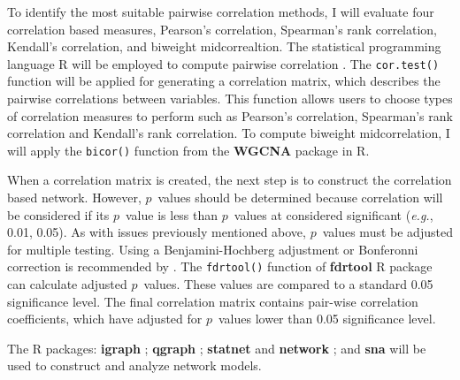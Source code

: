 To identify the most suitable pairwise correlation methods, I will evaluate four correlation based measures, Pearson's correlation, Spearman's rank correlation, Kendall's correlation, and biweight midcorrealtion. The statistical programming language \textsf{R} will be employed to compute pairwise correlation \citep{R:2014a}. The \texttt{cor.test()} function will be applied for generating a correlation matrix, which describes the pairwise correlations between variables. This function allows users to choose types of correlation measures to perform such as Pearson's correlation, Spearman's rank correlation and Kendall's rank correlation. To compute biweight midcorrelation, I will apply the \texttt{bicor()} function from the \textbf{WGCNA} package \citep{Langfelder:2008bd} in \textsf{R}. 

When a correlation matrix is created, the next step is to construct the correlation based network. However, $p$~values should be determined because correlation will be considered if    its $p$~value is less than $p$~values at considered significant (\textit{e.g.}, 0.01, 0.05). As with issues previously mentioned above, $p$~values must be adjusted for multiple testing. Using a Benjamini-Hochberg adjustment or Bonferonni correction is recommended by \citet{kolaczyk2014statistical}. The \texttt{fdrtool()} function of \textbf{fdrtool} R package can calculate adjusted $p$~values. These values are compared to a standard 0.05 significance level. The final correlation matrix contains pair-wise correlation coefficients, which have adjusted for $p$~values lower than 0.05 significance level.

The \textsf{R} packages: \textbf{igraph} \citep{Csardi:2010wx}; \textbf{qgraph} \citep{qgraph}; \textbf{statnet} \citep{statnetpackage} and \textbf{network} \citep{networkpackage}; and \textbf{sna} \citep{snapackage} will be used to construct and analyze network models.


